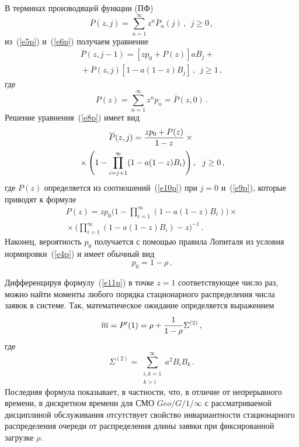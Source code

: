 \begin{multicols}{2}
В терминах производящей функции (ПФ)
$$
\overline P(z,j) = \sum_{n=1}^\infty z^n \overline P_{n}(j)\,,
\ \ j\ge 0\,,
$$
из~(\ref{e5p}) и~(\ref{e6p}) получаем уравнение
\begin{multline}
\overline P(z,j-1) = [z p_0 + P(z)] a B_j +\\
{}+
\overline P(z,j) [1-a(1-z) B_{j}]\,,
\ \ j\ge 1\,,  \label{e8p}
\end{multline}
где
\begin{equation}
P(z) = \sum_{n=1}^\infty z^n p_n = \overline P(z,0)\,.
\label{e9p}
\end{equation}
Решение уравнения~(\ref{e8p}) имеет вид
\begin{multline}
\overline P(z,j) =
 \displaystyle\frac{\displaystyle zp_0 + P(z)\mathstrut}{\displaystyle  1-z\mathstrut}\times{}\\
{} \times
\Bigg(
1 - \prod_{i=j+1}^\infty (1 - a(1-z) B_{i})
\Bigg)\,,
\ \ j\ge 0\,, \label{e10p}
\end{multline}
где $P(z)$ определяется из соотношений~(\ref{e10p}) при $j=0$
и~(\ref{e9p}), которые приводят к формуле
\begin{multline}
P(z) = z p_0 \Bigg(
1 - \prod_{i=1}^\infty (1 - a(1-z) B_{i})
\Bigg)\times{}\\
{}\times
\Bigg(
\prod_{i=1}^\infty      (1 - a(1-z) B_{i}) - z
\Bigg)^{-1}\,.
\label{e11p}
\end{multline}
Наконец, вероятность $p_0$ получается с помощью правила
Лопиталя из условия нормировки~(\ref{e4p}) и имеет обычный вид
$$
p_0=1-\rho\,.
$$

Дифференцируя формулу~(\ref{e11p}) в точке $z=1$ соответствующее
число раз, можно найти моменты любого порядка стационарного
распределения числа заявок в системе.
Так, математическое ожидание определяется выражением
\begin{equation}
\overline m =   P^\prime (1) = \rho + \displaystyle\frac{\displaystyle 1\mathstrut}{\displaystyle  1-\rho\mathstrut} \Sigma^{(2)}\,,
\label{e12p}
\end{equation}
где
\begin{equation}
\Sigma^{(2)} =  \sum^\infty_{\substack{{i,k=1}\\{k>i}}}
a^2 B_i B_k\,.
\label{e13p}
\end{equation}
Последняя формула показывает, в частности, что, в отличие от
непрерывного времени, в дискретном времени для СМО $Geo/G/1/\infty$
с рас\-смат\-ри\-ва\-е\-мой дисциплиной обслуживания отсутствует
 свойство
инвариантности стационарного распределения очереди
от распределения длины заявки при фиксированной загрузке $\rho$.


\end{multicols}
